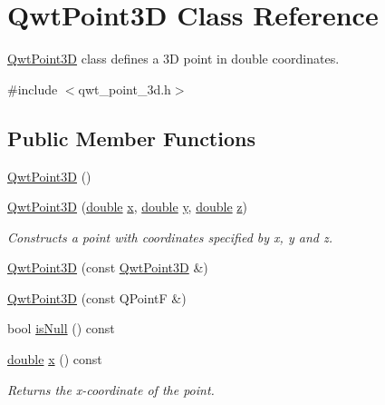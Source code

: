 \hypertarget{class_qwt_point3_d}{\section{Qwt\-Point3\-D Class Reference}
\label{class_qwt_point3_d}
}


\hyperlink{class_qwt_point3_d}{Qwt\-Point3\-D} class defines a 3\-D point in double coordinates.  




{\ttfamily \#include $<$qwt\-\_\-point\-\_\-3d.\-h$>$}

\subsection*{Public Member Functions}
\begin{DoxyCompactItemize}
\item 
\hyperlink{class_qwt_point3_d_acd7ec5a157397ce719225592b32cc510}{Qwt\-Point3\-D} ()
\item 
\hyperlink{class_qwt_point3_d_a33b9fa088b750e1f4ded65c23fb62868}{Qwt\-Point3\-D} (\hyperlink{_super_l_u_support_8h_a8956b2b9f49bf918deed98379d159ca7}{double} \hyperlink{glext_8h_a1db9d104e3c2128177f26aff7b46982f}{x}, \hyperlink{_super_l_u_support_8h_a8956b2b9f49bf918deed98379d159ca7}{double} \hyperlink{glext_8h_a42315f3ed8fff752bb47fd782309fcfc}{y}, \hyperlink{_super_l_u_support_8h_a8956b2b9f49bf918deed98379d159ca7}{double} \hyperlink{glext_8h_a642c8d69fd1a54f255c898df4f0dd7ca}{z})
\begin{DoxyCompactList}\small\item\em Constructs a point with coordinates specified by x, y and z. \end{DoxyCompactList}\item 
\hyperlink{class_qwt_point3_d_a3847545c69e11d4c33891c5d9218afee}{Qwt\-Point3\-D} (const \hyperlink{class_qwt_point3_d}{Qwt\-Point3\-D} \&)
\item 
\hyperlink{class_qwt_point3_d_a6747ac88e709543e57fc285e84181f49}{Qwt\-Point3\-D} (const Q\-Point\-F \&)
\item 
bool \hyperlink{class_qwt_point3_d_a4542223c75e50afac7124cd44ca9c900}{is\-Null} () const 
\item 
\hyperlink{_super_l_u_support_8h_a8956b2b9f49bf918deed98379d159ca7}{double} \hyperlink{class_qwt_point3_d_a055a9d12fbdc279452ee6c056bd3ba8f}{x} () const 
\begin{DoxyCompactList}\small\item\em Returns the x-\/coordinate of the point. \end{DoxyCompactList}\item 

\end{DoxyCompactItemize}
